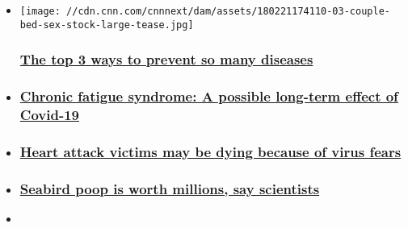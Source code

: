 \begin{itemize}
\item
  \href{/2020/08/07/health/exercise-sleep-prevent-disease-wellness/index.html}{}

  \texttt{[image: //cdn.cnn.com/cnnnext/dam/assets/180221174110-03-couple-bed-sex-stock-large-tease.jpg]}

  \hypertarget{the-top-3-ways-to-prevent-so-many-diseases}{%
  \subsubsection{\texorpdfstring{\href{/2020/08/07/health/exercise-sleep-prevent-disease-wellness/index.html}{The
  top 3 ways to prevent so many
  diseases}}{The top 3 ways to prevent so many diseases}}\label{the-top-3-ways-to-prevent-so-many-diseases}}
\item
  \hypertarget{chronic-fatigue-syndrome-a-possible-long-term-effect-of-covid-19}{%
  \subsubsection{\texorpdfstring{\href{/2020/08/07/health/chronic-fatigue-syndrome-covid-19-survivors-wellness/index.html}{Chronic
  fatigue syndrome: A possible long-term effect of
  Covid-19}}{Chronic fatigue syndrome: A possible long-term effect of Covid-19}}\label{chronic-fatigue-syndrome-a-possible-long-term-effect-of-covid-19}}
\item
  \hypertarget{heart-attack-victims-may-be-dying-because-of-virus-fears-}{%
  \subsubsection{\texorpdfstring{\href{/2020/08/07/health/heart-attack-avoid-hospital-covid-19-wellness/index.html}{Heart
  attack victims may be dying because of virus fears
  }}{Heart attack victims may be dying because of virus fears }}\label{heart-attack-victims-may-be-dying-because-of-virus-fears-}}
\item
  \hypertarget{seabird-poop-is-worth-millions-say-scientists}{%
  \subsubsection{\texorpdfstring{\href{/2020/08/06/world/sea-bird-conservation-value-of-poop-scn-trnd/index.html}{Seabird
  poop is worth millions, say
  scientists}}{Seabird poop is worth millions, say scientists}}\label{seabird-poop-is-worth-millions-say-scientists}}
\item
\end{itemize}

